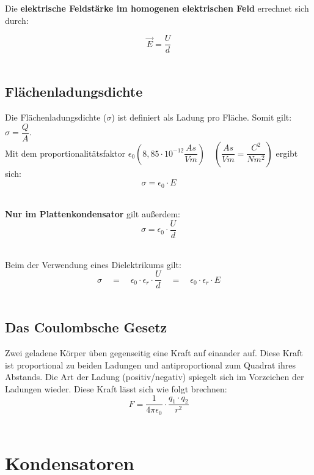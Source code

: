 \documentclass[a4paper]{article}
\begin{document}
Die \textbf{elektrische Feldstärke im homogenen elektrischen Feld} errechnet sich durch:

\Large$$\vec{E} = \dfrac{U}{d}$$\normalsize\\



\subsection{Flächenladungsdichte}

Die Flächenladungsdichte ($\sigma$) ist definiert als Ladung pro Fläche. Somit gilt:$\sigma = \dfrac{Q}{A}$.\\
Mit dem proportionalitätsfaktor $\epsilon_0 (8,85\cdot10^{-12}\dfrac{As}{Vm}) \quad (\dfrac{As}{Vm} = \dfrac{C^2}{Nm^2})$ ergibt sich:\\
\Large$$\sigma = \epsilon_0 \cdot E$$\\ \normalsize

\textbf{Nur im Plattenkondensator} gilt außerdem:\\
\Large$$\sigma = \epsilon_0 \cdot \dfrac{U}{d}$$\\ \normalsize

Beim der Verwendung eines Dielektrikums gilt:\\
\Large$$\sigma \quad=\quad \epsilon_0 \cdot \epsilon_r \cdot \dfrac{U}{d} \quad=\quad \epsilon_0 \cdot \epsilon_r \cdot E$$\\ \normalsize


\subsection{Das Coulombsche Gesetz}

Zwei geladene Körper üben gegenseitig eine Kraft auf einander auf. Diese Kraft ist proportional zu beiden Ladungen
und antiproportional zum Quadrat ihres Abstands. Die Art der Ladung (positiv/negativ) spiegelt sich im Vorzeichen
der Ladungen wieder. Diese Kraft lässt sich wie folgt brechnen:\\

\Large$$F = \dfrac{1}{4\pi \epsilon_0} \cdot \dfrac{q_1 \cdot q_2}{r^2}$$\\ \normalsize







\section{Kondensatoren}
\end{document}
